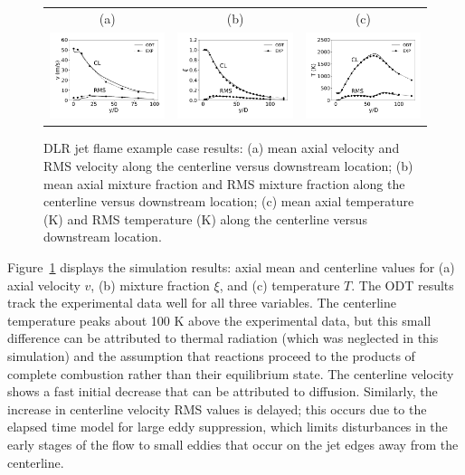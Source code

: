 \documentclass[preprint,12pt, a4paper]{elsarticle}
\begin{document}
\begin{figure}
	\begin{center}
		\begin{tabular}{ccc}
			(a) & (b) & (c) \\
			\includegraphics[width=2in]{../figures/cl_uvel_DLR_test_11.pdf} &
			\includegraphics[width=2in]{../figures/cl_mixf_DLR_test_11.pdf} &
			\includegraphics[width=2in]{../figures/cl_temp_DLR_test_11.pdf}
		\end{tabular}
	\end{center}
	\label{fig:dlr_example_results}
	\caption{DLR jet flame example case results: (a) mean axial velocity and RMS velocity along the centerline versus downstream location; (b) mean axial mixture fraction and RMS mixture fraction along the centerline versus downstream location; (c) mean axial temperature (K) and RMS temperature (K) along the centerline versus downstream location.}
\end{figure}

Figure~\ref{fig:dlr_example_results} displays the simulation results: axial mean and centerline values for (a) axial velocity $v$, (b) mixture fraction $\xi$, and (c) temperature $T$. The ODT results track the experimental data well for all three variables. The centerline temperature peaks about 100 K above the experimental data, but this small difference can be attributed to thermal radiation (which was neglected in this simulation) and the assumption that reactions proceed to the products of complete combustion rather than their equilibrium state. The centerline velocity shows a fast initial decrease that can be attributed to diffusion. Similarly, the increase in centerline velocity RMS values is delayed; this occurs due to the elapsed time model for large eddy suppression, which limits disturbances in the early stages of the flow to small eddies that occur on the jet edges away from the centerline. 
\end{document}
